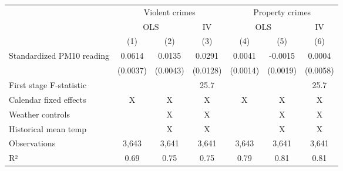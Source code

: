 \begingroup
\setlength{}
\setlength{}\fontsize{9.0pt}{10.8pt}\selectfont
\begin{longtable}{@{\extracolsep{\fill}}lcccccc}
\toprule
 & \multicolumn{3}{c}{Violent crimes} & \multicolumn{3}{c}{Property crimes} \\ 
\cmidrule(lr){2-4} \cmidrule(lr){5-7}
 & \multicolumn{2}{c}{OLS} & IV & \multicolumn{2}{c}{OLS} & IV \\ 
\cmidrule(lr){2-3} \cmidrule(lr){4-4} \cmidrule(lr){5-6} \cmidrule(lr){7-7}
  & (1) & (2) & (3) & (4) & (5) & (6) \\ 
\midrule\addlinespace[2.5pt]
Standardized PM10 reading & 0.0614 & 0.0135 & 0.0291 & 0.0041 & -0.0015 & 0.0004 \\ 
{} & {(0.0037)} & {(0.0043)} & {(0.0128)} & {(0.0014)} & {(0.0019)} & {(0.0058)} \\ 
First stage F-statistic &  &  & 25.7 &  &  & 25.7 \\ 
Calendar fixed effects & X & X & X & X & X & X \\ 
Weather controls &  & X & X &  & X & X \\ 
Historical mean temp &  & X & X &  & X & X \\ 
Observations & 3,643 & 3,641 & 3,641 & 3,643 & 3,641 & 3,641 \\ 
R² & 0.69 & 0.75 & 0.75 & 0.79 & 0.81 & 0.81 \\ 
\bottomrule
\end{longtable}
\endgroup

